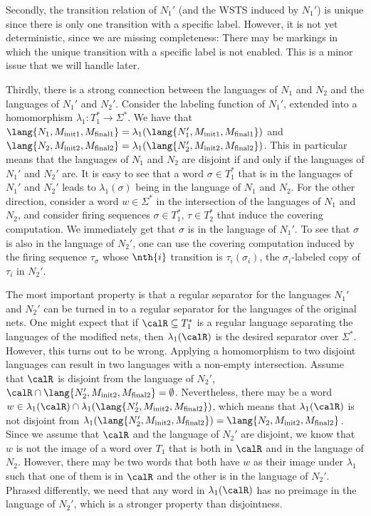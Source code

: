 \documentclass[../../diss.tex]{subfiles}
\begin{document}
Secondly, the transition relation of $N_1'$ (and the WSTS induced by $N_1'$) is unique since there is only one transition with a specific label.
However, it is not yet deterministic, since we are missing completeness:
There may be markings in which the unique transition with a specific label is not enabled.
This is a minor issue that we will handle later.

Thirdly, there is a strong connection between the languages of $N_1$ and $N_2$ and the languages of $N_1'$ and $N_2'$.
Consider the labeling function  of $N_1'$, extended into a homomorphism $\lambda_1 \colon T_1^* \to \Sigma^*$.
We have that $\lang{N_1,M_{\init1},M_{\final1}} = \lambda_1 ( \lang{N_1',M_{\init1},M_{\final1}}   )$
and $\lang{N_2,M_{\init2},M_{\final2}} = \lambda_1 ( \lang{N_2',M_{\init2},M_{\final2}}   )$.
This in particular means that the languages of $N_1$ and $N_2$ are disjoint if and only if the languages of $N_1'$ and $N_2'$ are.
It is easy to see that a word $\sigma \in T_1^*$ that is in the languages of $N_1'$ and $N_2'$ leads to $\lambda_1(\sigma)$ being in the language of $N_1$ and $N_2$.
For the other direction, consider a word $w \in \Sigma^*$ in the intersection of the languages of $N_1$ and $N_2$, and consider firing sequences $\sigma \in T_1^*$, $\tau \in T_2^*$ that induce the covering computation.
We immediately get that $\sigma$ is in the language of $N_1'$.
To see that $\sigma$ is also in the language of $N_2'$, one can use the covering computation induced by the firing sequence $\tau_\sigma$ whose $\nth{i}$ transition is $\tau_i (\sigma_i)$, the $\sigma_i$-labeled copy of $\tau_i$ in $N_2'$.

The most important property is that a regular separator for the languages $N_1'$ and $N_2'$ can be turned in to a regular separator for the languages of the original nets.
One might expect that if $\calR \subseteq T_1^*$ is a regular language separating the languages of the modified nets, then $\lambda_1(\calR)$ is the desired separator over $\Sigma^*$.
However, this turns out to be wrong.
Applying a homomorphism to two disjoint languages can result in two languages with a non-empty intersection.
Assume that $\calR$ is disjoint from the language of $N_2'$, $\calR \cap \lang{N_2',M_{\init2},M_{\final2}} = \emptyset$.
Nevertheless, there may be a word $w \in \lambda_1(\calR) \cap \lambda_1(\lang{N_2',M_{\init2},M_{\final2}})$, which means that $\lambda_1(\calR)$ is not disjoint from $\lambda_1(\lang{N_2',M_{\init2},M_{\final2}}) = \lang{N_2,M_{\init2},M_{\final2}}$.
Since we assume that $\calR$ and the language of $N_2'$ are disjoint, we know that $w$ is not the image of a word over $T_1$ that is both in $\calR$ and in the language of $N_2$.
However, there may be two words that both have $w$ as their image under $\lambda_1$ such that one of them is in $\calR$ and the other is in the language of $N_2'$.
Phrased differently, we need that any word in $\lambda_1(\calR)$ has no preimage in the language of $N_2'$, which is a stronger property than disjointness.
\end{document}
